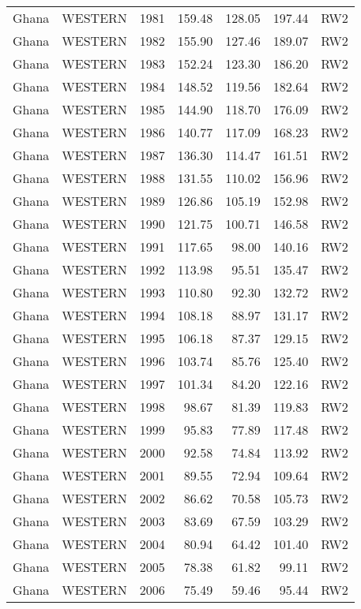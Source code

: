 \begin{longtable}{lllrrrl}
  Ghana & WESTERN & 1981 & 159.48 & 128.05 & 197.44 & RW2 \\ 
  Ghana & WESTERN & 1982 & 155.90 & 127.46 & 189.07 & RW2 \\ 
  Ghana & WESTERN & 1983 & 152.24 & 123.30 & 186.20 & RW2 \\ 
  Ghana & WESTERN & 1984 & 148.52 & 119.56 & 182.64 & RW2 \\ 
  Ghana & WESTERN & 1985 & 144.90 & 118.70 & 176.09 & RW2 \\ 
  Ghana & WESTERN & 1986 & 140.77 & 117.09 & 168.23 & RW2 \\ 
  Ghana & WESTERN & 1987 & 136.30 & 114.47 & 161.51 & RW2 \\ 
  Ghana & WESTERN & 1988 & 131.55 & 110.02 & 156.96 & RW2 \\ 
  Ghana & WESTERN & 1989 & 126.86 & 105.19 & 152.98 & RW2 \\ 
  Ghana & WESTERN & 1990 & 121.75 & 100.71 & 146.58 & RW2 \\ 
  Ghana & WESTERN & 1991 & 117.65 & 98.00 & 140.16 & RW2 \\ 
  Ghana & WESTERN & 1992 & 113.98 & 95.51 & 135.47 & RW2 \\ 
  Ghana & WESTERN & 1993 & 110.80 & 92.30 & 132.72 & RW2 \\ 
  Ghana & WESTERN & 1994 & 108.18 & 88.97 & 131.17 & RW2 \\ 
  Ghana & WESTERN & 1995 & 106.18 & 87.37 & 129.15 & RW2 \\ 
  Ghana & WESTERN & 1996 & 103.74 & 85.76 & 125.40 & RW2 \\ 
  Ghana & WESTERN & 1997 & 101.34 & 84.20 & 122.16 & RW2 \\ 
  Ghana & WESTERN & 1998 & 98.67 & 81.39 & 119.83 & RW2 \\ 
  Ghana & WESTERN & 1999 & 95.83 & 77.89 & 117.48 & RW2 \\ 
  Ghana & WESTERN & 2000 & 92.58 & 74.84 & 113.92 & RW2 \\ 
  Ghana & WESTERN & 2001 & 89.55 & 72.94 & 109.64 & RW2 \\ 
  Ghana & WESTERN & 2002 & 86.62 & 70.58 & 105.73 & RW2 \\ 
  Ghana & WESTERN & 2003 & 83.69 & 67.59 & 103.29 & RW2 \\ 
  Ghana & WESTERN & 2004 & 80.94 & 64.42 & 101.40 & RW2 \\ 
  Ghana & WESTERN & 2005 & 78.38 & 61.82 & 99.11 & RW2 \\ 
  Ghana & WESTERN & 2006 & 75.49 & 59.46 & 95.44 & RW2 \\ 

\end{longtable}
